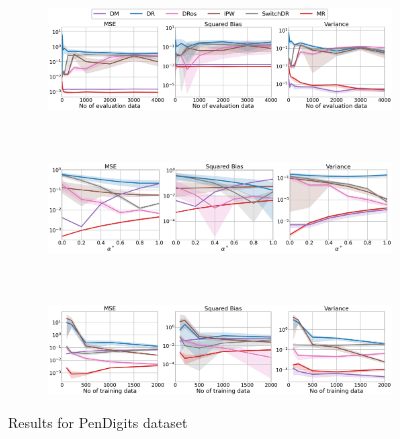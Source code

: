 \begin{figure}[h!]
    \centering
	\begin{subfigure}{0.8\textwidth}
	    \centering
	    \includegraphics[width=1\textwidth]{figures/mr/multiclass/ope_vs_n_alphatar_0_2_pendigits_ntr1000.png}
	    \label{subfig:pen-neval}
	\end{subfigure}\\
	\begin{subfigure}{0.8\textwidth} 
	    \centering
	    \includegraphics[width=1\textwidth]{figures/mr/multiclass/ope_vs_alphatar_neval_1000_pendigits_ntr_1000.png}
	    \label{subfig:pen-ae}
	\end{subfigure}\\
        \begin{subfigure}{0.8\textwidth} 
	    \centering
	    \includegraphics[width=1\textwidth]{figures/mr/multiclass/ope_vs_ntr_neval_1000_pendigits_alpha_0_6.png}
	    \label{subfig:pen-tr}
	\end{subfigure}
    \caption{Results for PenDigits dataset}
    \label{fig:pendigits}
\end{figure}

